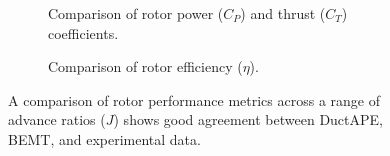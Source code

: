 \begin{figure}[h!]
     \centering
     \begin{subfigure}[t]{0.45\textwidth}
        \centering
        
        \caption{Comparison of rotor power (\(C_P\)) and thrust (\(C_T\)) coefficients.}
        \label{}
     \end{subfigure}
     \hfill
     \begin{subfigure}[t]{0.45\textwidth}
         \centering
        
        \caption{Comparison of rotor efficiency (\(\eta\)).}
        \label{}
     \end{subfigure}
     \caption{A comparison of rotor performance metrics across a range of advance ratios (\(J\)) shows good agreement between DuctAPE, BEMT, and experimental data.}
    \label{fig:rotval1}
\end{figure}

